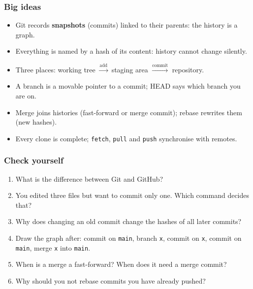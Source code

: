 \documentclass[aspectratio=169,10pt,compress]{beamer}
\begin{document}




\begin{frame}[t,fragile] \frametitle{Big ideas}
  \begin{itemize}
    \item Git records \textbf{snapshots} (commits) linked to their parents: the history is a graph.
    \item Everything is named by a hash of its content: history cannot change silently.
    \item Three places: working tree $\xrightarrow{\text{add}}$ staging area $\xrightarrow{\text{commit}}$ repository.
    \item A branch is a movable pointer to a commit; HEAD says which branch you are on.
    \item Merge joins histories (fast-forward or merge commit); rebase rewrites them (new hashes).
    \item Every clone is complete; \texttt{fetch}, \texttt{pull} and \texttt{push} synchronise with remotes.
  \end{itemize}
\end{frame}




\begin{frame}[t,fragile] \frametitle{Check yourself}
  \begin{enumerate}\small
    \item What is the difference between Git and GitHub?
    \item You edited three files but want to commit only one. Which command decides that?
    \item Why does changing an old commit change the hashes of all later commits?
    \item Draw the graph after: commit on \texttt{main}, branch \texttt{x}, commit on \texttt{x}, commit on \texttt{main}, merge \texttt{x} into \texttt{main}.
    \item When is a merge a fast-forward? When does it need a merge commit?
    \item Why should you not rebase commits you have already pushed?
  \end{enumerate}
\end{frame}




\begin{frame}[t,fragile]
	\begin{center}
		\vspace{4cm}
	\end{center}
\end{frame}
\end{document}
